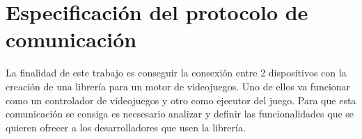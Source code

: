 %
%
%
%
%
%
%
%
%
%


\begin{FraseCelebre}
\begin{Frase}
\end{Frase}
\begin{Fuente}
\end{Fuente}
\end{FraseCelebre}


\chapter{Especificaci\'on del protocolo de comunicaci\'on}
\label{cap3}
\label{cap:especificacion}


La finalidad de este trabajo es conseguir la consexi\'on entre 2 dispositivos con la creaci\'on de una librer\'ia para un motor de videojuegos. Uno de ellos va funcionar como un controlador de videojuegos y otro como ejecutor del juego. Para que esta comunicaci\'on se consiga es necsesario analizar y definir las funcionalidades que se quieren ofrecer a los desarrolladores que usen la librer\'ia. \\

